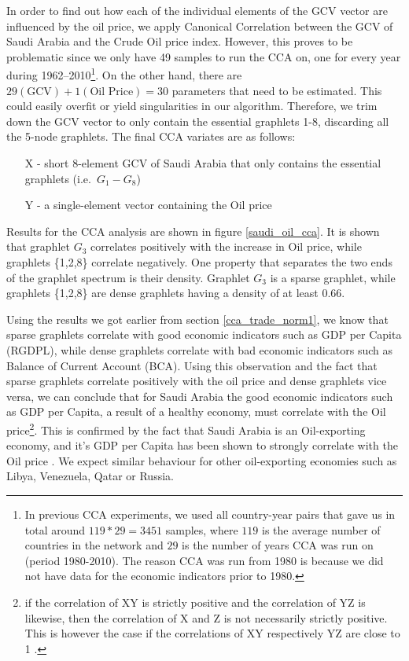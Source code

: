 
In order to find out how each of the individual elements of the GCV vector are influenced by the oil price, we apply Canonical Correlation between the GCV of Saudi Arabia and the Crude Oil price index. However, this proves to be problematic since we only have 49 samples to run the CCA on, one for every year during 1962--2010\footnote{In previous CCA experiments, we used all country-year pairs that gave us in total around $119 * 29 = 3451$ samples, where $119$ is the average number of countries in the network and $29$ is the number of years CCA was run on (period 1980-2010). The reason CCA was run from 1980 is because we did not have data for the economic indicators prior to 1980.}. On the other hand, there are $29 (\text{GCV}) + 1(\text{Oil Price}) = 30$ parameters that need to be estimated. This could easily overfit or yield singularities in our algorithm. Therefore, we trim down the GCV vector to only contain the essential graphlets 1-8, discarding all the 5-node graphlets. The final CCA variates  are as 
follows:
\begin{itemize}
 \item[X] - short 8-element GCV of Saudi Arabia that only contains the essential graphlets (i.e.\ $G_1-G_8$)
 \item[Y] - a single-element vector containing the Oil price 
\end{itemize}

Results for the CCA analysis are shown in figure \ref{saudi_oil_cca}. It is shown that graphlet $G_3$ correlates positively with the increase in Oil price, while graphlets \{1,2,8\} correlate negatively. One property that separates the two ends of the graphlet spectrum is their density. Graphlet $G_3$ is a sparse graphlet, while graphlets \{1,2,8\} are dense graphlets having a density of at least 0.66. 

Using the results we got earlier from section \ref{cca_trade_norm1}, we know that sparse graphlets correlate with good economic indicators such as GDP per Capita (RGDPL), while dense graphlets correlate with bad economic indicators such as Balance of Current Account (BCA). Using this observation and the fact that sparse graphlets correlate positively with the oil price and dense graphlets vice versa, we can conclude that for Saudi Arabia the good economic indicators such as GDP per Capita, a result of a healthy economy, must correlate with the Oil price\footnote{if the correlation of XY is strictly positive and the correlation of YZ is likewise, then the correlation of X and Z is not necessarily strictly positive. This is however the case if the correlations of XY respectively YZ are close to 1 \cite{langford2001property}.}. This is confirmed by the fact that Saudi Arabia is an Oil-exporting economy, and it's GDP per Capita has been shown to strongly correlate with the Oil price \cite{
lescaroux2008influence}. We expect similar behaviour for other oil-exporting economies such as Libya, Venezuela, Qatar or Russia.


